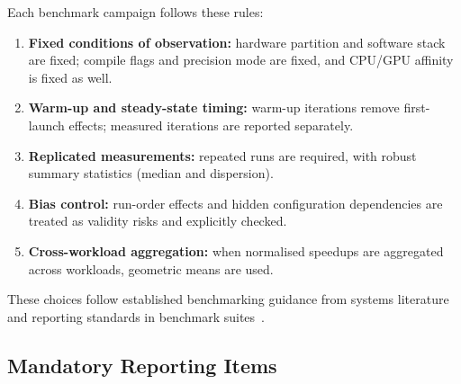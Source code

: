 Each benchmark campaign follows these rules:
\begin{enumerate}
  \item \textbf{Fixed conditions of observation:} hardware partition and software
  stack are fixed; compile flags and precision mode are fixed, and CPU/GPU
  affinity is fixed as well.
  \item \textbf{Warm-up and steady-state timing:} warm-up iterations remove
  first-launch effects; measured iterations are reported separately.
  \item \textbf{Replicated measurements:} repeated runs are required, with
  robust summary statistics (median and dispersion).
  \item \textbf{Bias control:} run-order effects and hidden configuration
  dependencies are treated as validity risks and explicitly checked.
  \item \textbf{Cross-workload aggregation:} when normalised speedups are
  aggregated across workloads, geometric means are used.
\end{enumerate}

These choices follow established benchmarking guidance from systems
literature~\cite{kalibera2013rigorous,mytkowicz2009wrongdata,fleming1986geomean}
and reporting standards in benchmark suites~\cite{spec-cpu2017-runrules}.

\subsection{Mandatory Reporting Items}

